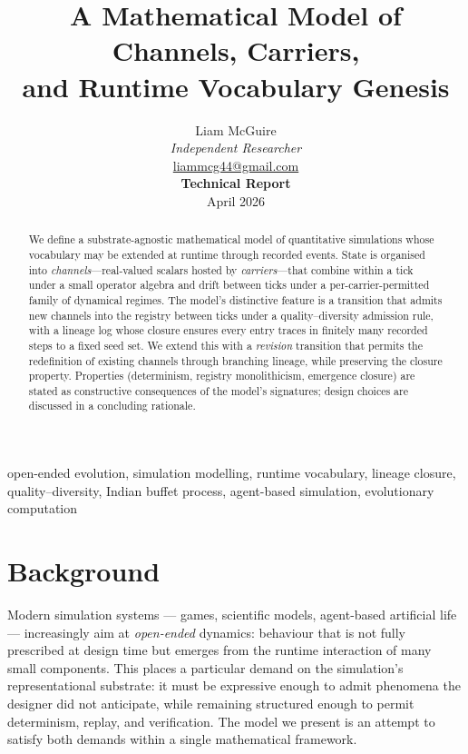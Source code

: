 \documentclass[journal,onecolumn,11pt]{IEEEtran}
\title{A Mathematical Model of Channels, Carriers,\\and Runtime Vocabulary Genesis}
\author{Liam McGuire\\
\textit{Independent Researcher}\\
\href{mailto:liammcg44@gmail.com}{liammcg44@gmail.com}\\
\textbf{Technical Report} \\
April 2026}
\theoremstyle{definition}
\begin{document}
\maketitle

\begin{abstract}
We define a substrate-agnostic mathematical model of quantitative simulations whose vocabulary may be extended at runtime through recorded events. State is organised into \emph{channels}---real-valued scalars hosted by \emph{carriers}---that combine within a tick under a small operator algebra and drift between ticks under a per-carrier-permitted family of dynamical regimes. The model's distinctive feature is a transition that admits new channels into the registry between ticks under a quality--diversity admission rule, with a lineage log whose closure ensures every entry traces in finitely many recorded steps to a fixed seed set. We extend this with a \emph{revision} transition that permits the redefinition of existing channels through branching lineage, while preserving the closure property. Properties (determinism, registry monolithicism, emergence closure) are stated as constructive consequences of the model's signatures; design choices are discussed in a concluding rationale.
\end{abstract}

\begin{IEEEkeywords}
open-ended evolution, simulation modelling, runtime vocabulary, lineage closure, quality--diversity, Indian buffet process, agent-based simulation, evolutionary computation
\end{IEEEkeywords}

\section{Background}
\label{sec:background}

Modern simulation systems --- games, scientific models, agent-based artificial life --- increasingly aim at \emph{open-ended} dynamics: behaviour that is not fully prescribed at design time but emerges from the runtime interaction of many small components. This places a particular demand on the simulation's representational substrate: it must be expressive enough to admit phenomena the designer did not anticipate, while remaining structured enough to permit determinism, replay, and verification. The model we present is an attempt to satisfy both demands within a single mathematical framework.
\end{document}
